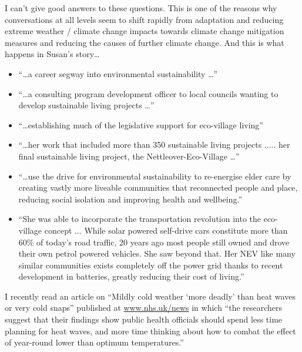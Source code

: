 I can't give good answers to these questions. This is one of the reasons why conversations at all levels seem to shift rapidly from adaptation and reducing extreme weather / climate change impacts towards climate change mitigation measures and reducing the causes of further climate change. And this is what happens in Susan's story\ldots
\begin{itemize}
	\item ``\ldots a career segway into environmental sustainability \ldots''
	\item ``\ldots a consulting program development officer to local councils wanting to develop sustainable living projects \dots''
	\item ``\ldots establishing much of the legislative support for eco-village living''
	\item ``\ldots her work that included more than 350 sustainable living projects ..... her final sustainable living project, the Nettleover-Eco-Village \dots''
	\item ``\ldots use the drive for environmental sustainability to re-energise elder care by creating vastly more liveable communities that reconnected people and place, reducing social isolation and improving health and wellbeing.''
	\item ``She was able to incorporate the transportation revolution into the eco-village concept ... While solar powered self-drive cars constitute more than 60\% of today's road traffic, 20 years ago most people still owned and drove their own petrol powered vehicles. She saw beyond that. Her NEV like many similar communities exists completely off the power grid thanks to recent development in batteries, greatly reducing their cost of living.''
\end{itemize}

I recently read an article on ``Mildly cold weather `more deadly' than heat waves or very cold snaps'' published at \url{www.nhs.uk/news} in which ``the researchers suggest that their findings show public health officials should spend less time planning for heat waves, and more time thinking about how to combat the effect of year-round lower than optimum temperatures.''

